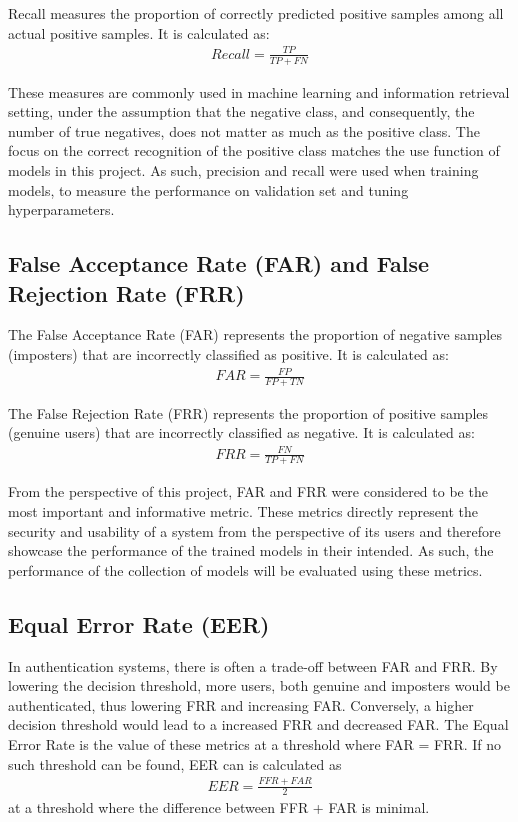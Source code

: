 Recall measures the proportion of correctly predicted positive samples among all actual positive samples. It is calculated as:
\begin{align}
Recall = \frac{TP}{TP + FN}
\end{align}

These measures are commonly used in machine learning and information retrieval setting, under the assumption that the negative class, and consequently, the number of true negatives, does not matter as much as the positive class. The focus on the correct recognition of the positive class matches the use function of models in this project.
As such, precision and recall were used when training models, to measure the performance on validation set and tuning hyperparameters.

\subsection{False Acceptance Rate (FAR) and False Rejection Rate (FRR)} \label{FAR_FRR_theory}
The False Acceptance Rate (FAR) represents the proportion of negative samples (imposters) that are incorrectly classified as positive. It is calculated as:
\begin{align}
FAR = \frac{FP}{FP + TN}
\end{align}

The False Rejection Rate (FRR) represents the proportion of positive samples (genuine users) that are incorrectly classified as negative. It is calculated as:
\begin{align}
FRR = \frac{FN}{TP + FN}
\end{align}

From the perspective of this project, FAR and FRR were considered to be the most important and informative metric. These metrics directly represent the security and usability of a system from the perspective of its users and therefore showcase the performance of the trained models in their intended. As such, the performance of the collection of models will be evaluated using these metrics. 

\subsection{Equal Error Rate (EER)}
In authentication systems, there is often a trade-off between FAR and FRR. By lowering the decision threshold, more users, both genuine and imposters would be authenticated, thus lowering FRR and increasing FAR. Conversely, a higher decision threshold would lead to a increased FRR and decreased FAR.
The Equal Error Rate is the value of these metrics at a threshold where FAR = FRR. If no such threshold can be found, EER can is calculated as  
\begin{align}
EER = \frac{FFR + FAR}{2}
\end{align}
at a threshold where the difference between FFR + FAR is minimal.

